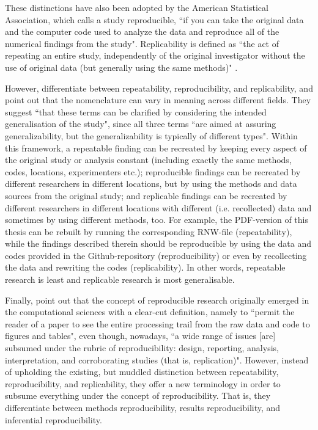 \documentclass[11pt, a4paper,twoside]{report}\usepackage[]{graphicx}\usepackage[]{color}
\begin{document}
These distinctions have also been adopted by the American Statistical Association, which calls a study reproducible, ``if you can take the original data and the computer code used to analyze the data and reproduce all of the numerical findings from the study". Replicability is defined as ``the act of repeating an entire study, independently of the original investigator without the use of original data (but generally using the same methods)" \citep{broman_recommendation_2017}.

However, \cite{kenett2015clarifying} differentiate between repeatability, reproducibility, and replicability, and point out that the nomenclature can vary in meaning across different fields. They suggest ``that these terms can be clarified by considering the intended generalisation of the study", since all three terms ``are aimed at assuring generalizability, but the generalizability is typically of different types". Within this framework, a repeatable finding can be recreated by keeping every aspect of the original study or analysis constant (including exactly the same methods, codes, locations, experimenters etc.); reproducible findings can be recreated by different researchers in different locations, but by using the methods and data sources from the original study; and replicable findings can be recreated by different researchers in different locations with different (i.e. recollected) data and sometimes by using different methods, too. For example, the PDF-version of this thesis can be rebuilt by running the corresponding RNW-file (repeatability), while the findings described therein should be reproducible by using the data and codes provided in the Github-repository (reproducibility) or even by recollecting the data and rewriting the codes (replicability). In other words, repeatable research is least and replicable research is most generalisable.

Finally, \cite{goodman_what_2016} point out that the concept of reproducible research originally emerged in the computational sciences with a clear-cut definition, namely to ``permit the reader of a paper to see the entire processing trail from the raw data and code to figures and tables", even though, nowadays, ``a wide range of issues [are] subsumed under the rubric of reproducibility: design, reporting, analysis, interpretation, and corroborating studies (that is, replication)". However, instead of upholding the existing, but muddled distinction between repeatability, reproducibility, and replicability, they offer a new terminology in order to subsume everything under the concept of reproducibility. That is, they differentiate between methods reproducibility, results reproducibility, and inferential reproducibility. 
\end{document}
